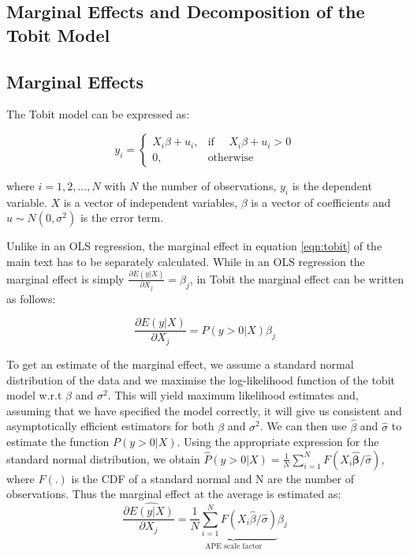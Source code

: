 \documentclass[11pt, oneside]{article}
\begin{document}
	
	
	
	
	\newpage
	
	
	
	
	\newpage
	\begin{appendices}
		
		\section{ Marginal Effects  and Decomposition of the Tobit Model}
		\setcounter{equation}{0}
		\label{app:TobitDecomp}
		
	   \subsection{ Marginal Effects}
		The Tobit model can be expressed as:
		
		\begin{equation*}
		y_i= 
		\begin{cases}
		X_i \beta  + u_i ,& \text{if } \quad X_i \beta  + u_i >0\\
		0,              & \text{otherwise}
		\end{cases}
		\end{equation*}
		
		where $i=1,2,...,N$ with $N$ the number of observations, $y_i$ is the dependent variable. $X$ is a vector of independent variables, $\beta$ is a vector of coefficients and $u \sim N(0,\sigma^2)$ is the error term. 
		
			Unlike in an OLS regression, the marginal effect in equation \ref{eqn:tobit} of the main text has to be separately calculated. While in an OLS regression the marginal effect is simply $\frac{\partial E(y|X)}{\partial X_{j}}=\beta_j$, in Tobit the marginal effect can be written as follows:
		
		\begin{equation}
		\label{eqn:tobit_marginal}
		\frac{\partial E(y| X)}{\partial X_j} = P(y>0|X) \beta_j
		\end{equation}
		
		
		\noindent To get an estimate of the marginal effect, we assume a standard normal distribution of the data and we maximise the log-likelihood function of the tobit model w.r.t $\beta$ and $\sigma^2$. This will yield maximum likelihood estimates and, assuming that we have specified the model correctly, it will give us consistent and asymptotically efficient estimators for both $\beta$ and $\sigma^2$. We can then use $\hat{\beta}$ and $\hat{\sigma}$ to estimate the function $P(y>0|X)$. Using the appropriate expression for the standard normal distribution, we obtain $\hat{P}(y>0|X)=\frac{1}{N} \sum_{i=1}^N F(X_i \hat{\boldsymbol{\beta}}/ \hat{\sigma})$, where $F(.)$ is the CDF of a standard normal and N are the number of observations. Thus the marginal effect at the average is estimated as:
		\[
		\frac{\partial \widehat{E(y|X)}}{\partial X_j} = \underbrace{\frac{1}{N} \sum_{i=1}^N F(X_{i} \hat{\beta}/ \hat{\sigma})}_\text{APE scale factor} \hat \beta_j
		\]
		

\end{appendices}
\end{document}
